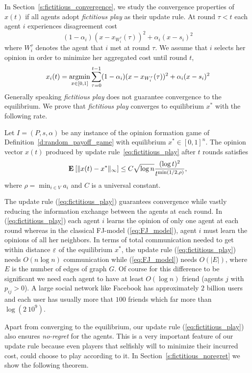 In Section~\ref{s:fictitious_convergence}, we study the convergence properties of $x(t)$ if all agents adopt \emph{fictitious play}
as their update rule. At round $\tau < t$ each agent $i$ experiences disagreement cost
\[(1-\alpha_i)(x-x_{W_i^\tau}(\tau))^2+\alpha_i(x-s_i)^2 \]where $W_i^\tau$
denotes the agent that $i$ met at round $\tau$. We assume that $i$ selects her opinion
in order to minimize her aggregated cost until round $t$,
\begin{equation}\label{eq:fictitious_play}
x_i(t) =\operatorname*{argmin}_{x \in [0,1]}\sum_{\tau=0}^{t-1}(1-\alpha_i)(x-x_{W_i^\tau}(\tau))^2+\alpha_i(x-s_i)^2
\end{equation}
\noindent Generally speaking \emph{fictitious play} does not guarantee
convergence to the equilibrium. We prove that \emph{fictitious play}
converges to equilibrium $x^*$ with the following
rate.
\begin{theorem}\label{t:fictitious_convergence}
  Let $I = (P,s, \alpha)$ be any instance of the opinion formation
  game of Definition~\ref{d:random_payoff_game} with equilibrium
  $x^* \in [0,1]^n$.  The opinion vector $x(t)$ produced by
  update rule~\ref{eq:fictitious_play} after $t$ rounds satisfies
  \[
    \bm{\mathrm{E}}_{} \left[ \| x(t) - x^* \|_{\infty} \right] \leq
    C \sqrt{\log n}\frac{(\log t)^{2}}{t^{\min(1/2,\rho)}},
  \]
  where $\rho = \min_{i \in V} a_i$ and $C$ is a universal constant.
\end{theorem}
The update rule (\ref{eq:fictitious_play}) guarantees convergence
while vastly reducing the information exchange between the agents
at each round. In (\ref{eq:fictitious_play}) each agent $i$ learns the opinion of only one agent
at each round whereas in the classical FJ-model (\ref{eq:FJ_model}), agent $i$ must
learn the opinions of all her neighbors. In terms of
total communication needed to get within distance $\varepsilon$ of the
equilibrium $x^*$, the update rule (\ref{eq:fictitious_play}) needs
$O(n \log n)$ communication while (\ref{eq:FJ_model}) needs
$O(|E|)$, where $E$ is the number of edges of graph $G$.
Of course for this difference to be significant we need
each agent to have at least $O(\log n)$ friend (agents $j$ with $p_{ij}>0$). A large social
network like Facebook has approximately $2$ billion users and each user
has usually more that $100$ friends which far more than $\log(2\ 10^9)$.

Apart from converging to the equilibrium, our update rule
(\ref{eq:fictitious_play}) also ensures \emph{no-regret} for the agents.
This is a very important feature of our update rule because even players
that selfishly will to minimize their incurred cost, could choose to play according
to it.  In Section~\ref{s:fictitious_noregret} we show the following theorem.

